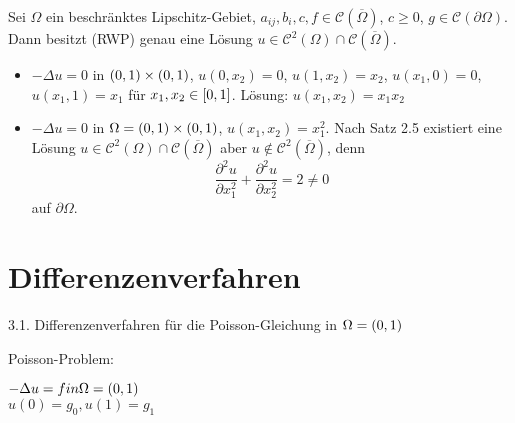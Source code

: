 \documentclass{cheat-sheet}
\newcommand{\Cont}{\mathcal{C}} %
\newcommand{\clos}[1]{\overline{#1}} %
\newcommand{\cOmega}{\clos{\Omega}} %
\newcommand{\bOmega}{\partial \Omega} %
\newcommand{\Laplace}{\Delta}
\begin{document}
\begin{satz}
  Sei $\Omega$ ein beschränktes Lipschitz-Gebiet, $a_{ij}, b_i, c, f \in \Cont(\cOmega)$, $c \geq 0$, $g \in \Cont(\bOmega)$.
  Dann besitzt (RWP) genau eine Lösung $u \in \Cont^2(\Omega) \cap \Cont(\cOmega)$.
\end{satz}


\begin{bspe}
  \begin{itemize}
    \item $- \Laplace u = 0$ in $\left( 0, 1 \right) \times \left( 0, 1 \right)$, $u(0, x_2) = 0$, $u(1, x_2) = x_2$, $u(x_1, 0) = 0$, $u(x_1, 1) = x_1$ für $x_1, x_2 \in \left[ 0, 1 \right]$.
    Lösung: $u(x_1, x_2) = x_1 x_2$
    \item $- \Laplace u = 0$ in $\Omega = \left( 0, 1 \right) \times \left( 0, 1 \right)$,
    $u(x_1, x_2) = x_1^2$.
    Nach Satz 2.5 existiert eine Lösung $u \in \Cont^2(\Omega) \cap \Cont(\cOmega)$ aber $u \not\in \Cont^2(\cOmega)$, denn
    \[ \frac{\partial^2 u}{\partial x_1^2} + \frac{\partial^2 u}{\partial x_2^2} = 2 \neq 0 \] auf $\bOmega$.
  \end{itemize}
\end{bspe}

\section{Differenzenverfahren}

3.1. Differenzenverfahren für die Poisson-Gleichung in $\Omega = \left( 0, 1 \right)$

Poisson-Problem:

$- \Laplace u = f in \Omega = \ointerval{0}{1}$ \\
$u(0) = g_0, u(1) = g_1$
\end{document}
